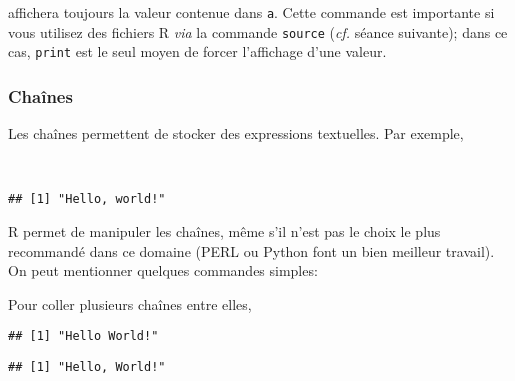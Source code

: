 \noindent affichera toujours la valeur contenue dans \texttt{a}.
Cette commande est importante si vous utilisez des fichiers R \emph{via} la commande \texttt{source} (\emph{cf.} séance suivante);
dans ce cas, \texttt{print} est le seul moyen de forcer l'affichage d'une valeur.

\subsubsection{Chaînes}

Les chaînes permettent de stocker des expressions textuelles.
Par exemple,

\begin{knitrout}
\color{fgcolor}\begin{kframe}
\begin{flushleft}
\ttfamily\noindent
{}\hlassignement{\usebox{\hlnormalsizeboxlessthan}-}{\ }\hspace*{\fill}\\
\hlstd{}\mbox{}
\normalfont
\end{flushleft}
\begin{verbatim}
## [1] "Hello, world!"
\end{verbatim}
\end{kframe}
\end{knitrout}


R permet de manipuler les chaînes, même s'il n'est pas le choix le plus recommandé dans ce domaine (PERL ou Python font un bien meilleur travail).
On peut mentionner quelques commandes simples:

Pour coller plusieurs chaînes entre elles,

\begin{knitrout}
\color{fgcolor}\begin{kframe}
\begin{flushleft}
\ttfamily\noindent
{}\hlkeyword{(}\hlkeyword{,}{\ }\hlkeyword{)}\mbox{}
\normalfont
\end{flushleft}
\begin{verbatim}
## [1] "Hello World!"
\end{verbatim}
\begin{flushleft}
\ttfamily\noindent
{}\hlkeyword{(}\hlkeyword{,}{\ }\hlkeyword{,}{\ }\hlargument{=}{\ }\hlkeyword{)}\mbox{}
\normalfont
\end{flushleft}
\begin{verbatim}
## [1] "Hello, World!"
\end{verbatim}
\end{kframe}
\end{knitrout}


